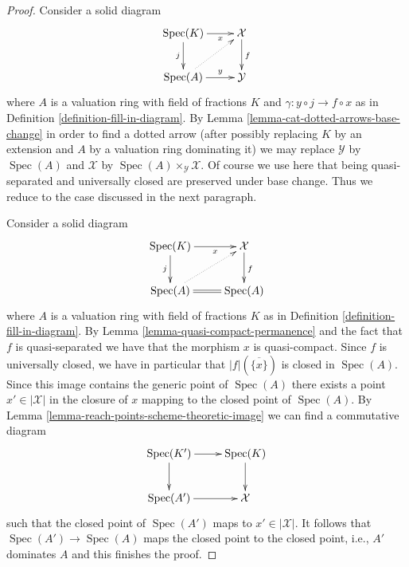 \documentclass[10pt,a4paper]{amsart}
\theoremstyle{plain}
\theoremstyle{definition}
\theoremstyle{remark}
\numberwithin{equation}{subsection}
\def\Spec{\mathop{\mathrm{Spec}}}
\begin{document}
\begin{proof}
Consider a solid diagram
$$
\xymatrix{
\Spec(K) \ar[r]_-x \ar[d]_j & \mathcal{X} \ar[d]^f \\
\Spec(A) \ar[r]^-y \ar@{..>}[ru] & \mathcal{Y}
}
$$
where $A$ is a valuation ring with field of fractions $K$
and $\gamma : y \circ j \longrightarrow f \circ x$ as in
Definition \ref{definition-fill-in-diagram}. By
Lemma \ref{lemma-cat-dotted-arrows-base-change}
in order to find a dotted arrow (after possibly replacing
$K$ by an extension and $A$ by a valuation ring dominating it)
we may replace $\mathcal{Y}$ by $\Spec(A)$ and $\mathcal{X}$
by $\Spec(A) \times_\mathcal{Y} \mathcal{X}$. Of course
we use here that being
quasi-separated and universally closed are preserved under base change.
Thus we reduce to the case discussed in the next paragraph.

\medskip\noindent
Consider a solid diagram
$$
\xymatrix{
\Spec(K) \ar[r]_-x \ar[d]_j & \mathcal{X} \ar[d]^f \\
\Spec(A) \ar@{=}[r] \ar@{..>}[ru] & \Spec(A)
}
$$
where $A$ is a valuation ring with field of fractions $K$ as in
Definition \ref{definition-fill-in-diagram}.
By Lemma \ref{lemma-quasi-compact-permanence} and the fact
that $f$ is quasi-separated we have that
the morphism $x$ is quasi-compact.
Since $f$ is universally closed, we have in particular
that $|f|(\overline{\{x\}})$ is closed in $\Spec(A)$.
Since this image contains the generic point of $\Spec(A)$
there exists a point $x' \in |\mathcal{X}|$ in the closure
of $x$ mapping to the closed point of $\Spec(A)$.
By Lemma \ref{lemma-reach-points-scheme-theoretic-image}
we can find a commutative diagram
$$
\xymatrix{
\Spec(K') \ar[r] \ar[d] & \Spec(K) \ar[d] \\
\Spec(A') \ar[r] & \mathcal{X}
}
$$
such that the closed point of $\Spec(A')$ maps to $x' \in |\mathcal{X}|$.
It follows that $\Spec(A') \to \Spec(A)$ maps the closed point
to the closed point, i.e., $A'$ dominates $A$ and this finishes the proof.
\end{proof}
\end{document}
